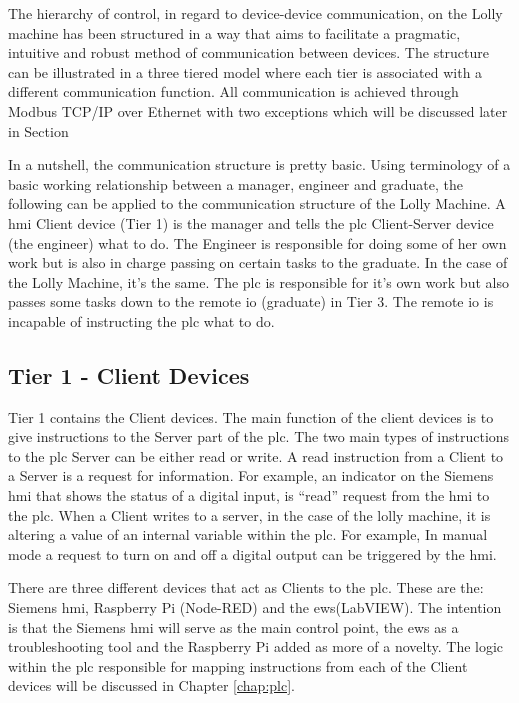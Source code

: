         The hierarchy of control, in regard to device-device communication, on the Lolly machine has been structured in a way that aims to facilitate a pragmatic, intuitive and robust method of communication between devices. The structure can be illustrated in a three tiered model where each tier is associated with a different communication function. All communication is achieved through Modbus TCP/IP over Ethernet with two exceptions which will be discussed later in Section 

        In a nutshell, the communication structure is pretty basic. Using terminology of a basic working relationship between a manager,  engineer and graduate,  the following can be applied to the communication structure of the Lolly Machine. A \acrshort{hmi} Client device (Tier 1) is the manager and tells the \acrshort{plc} Client-Server device (the engineer) what to do. The Engineer is responsible for doing some of her own work but is also in charge passing on certain tasks to the graduate. In the case of the Lolly Machine, it’s the same. The \acrshort{plc} is responsible for it’s own work but also passes some tasks down to the remote \acrshort{io} (graduate) in Tier 3. The remote \acrshort{io} is incapable of instructing the \acrshort{plc} what to do. 

        \subsection{Tier 1 - Client Devices}

        Tier 1 contains the Client devices. The main function of the client devices is to give instructions to the Server part of the \acrshort{plc}. The two main types of instructions to the \acrshort{plc} Server can be either read or write. A read instruction from a Client to a Server is a request for information. For example, an indicator on the Siemens \acrshort{hmi} that shows the status of a digital input, is “read” request from the \acrshort{hmi} to the \acrshort{plc}. When a Client writes to a server, in the case of the lolly machine, it is altering a value of an internal variable within the \acrshort{plc}. For example, In manual mode a request to turn on and off a digital output can be triggered by the \acrshort{hmi}.

        There are three different devices that act as Clients to the \acrshort{plc}. These are the: Siemens \acrshort{hmi}, Raspberry Pi (Node-RED) and the \acrshort{ews}(LabVIEW). The intention is that the Siemens \acrshort{hmi} will serve as the main control point, the \acrshort{ews} as a troubleshooting tool and the Raspberry Pi added as more of a novelty. The logic within the \acrshort{plc} responsible for mapping instructions from each of the Client devices will be discussed in Chapter \ref{chap:plc}.

